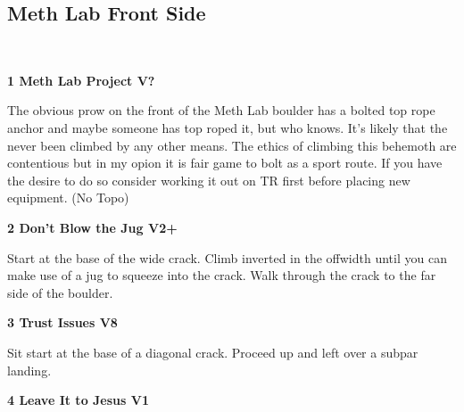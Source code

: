 \begin{multicols}{2}
\begin{minipage}{\columnwidth}
			\subsection*{Meth Lab Front Side}\label{bf:Meth Lab Front Side}
			\
			
			\end{minipage}
			
					\begin{minipage}{\linewidth}	
					\label{rt:Meth Lab Project}
\colorbox{black!20}{
\parbox{0.95\textwidth}{
\textbf{
1 Meth Lab Project V?  \warn \warn \warn 
}
}
}

					\begin{adjustwidth}{0.5cm}{}				
					The obvious prow on the front of the Meth Lab boulder has a bolted top rope anchor and maybe someone has top roped it, but who knows. It's likely that the never been climbed by any other means. The ethics of climbing this behemoth are contentious but in my opion it is fair game to bolt as a sport route. If you have the desire to do so consider working it out on TR first before placing new equipment.
						\newline (No Topo) 
					\end{adjustwidth}
					\end{minipage}
					\begin{minipage}{\linewidth}	
					\label{rt:Don't Blow the Jug}
\colorbox{green!20}{
\parbox{0.95\textwidth}{
\textbf{
2 Don't Blow the Jug V2+    \warn 
}
}
}

					\begin{adjustwidth}{0.5cm}{}				
					Start at the base of the wide crack. Climb inverted in the offwidth until you can make use of a jug to squeeze into the crack. Walk through the crack to the far side of the boulder.
					\end{adjustwidth}
					\end{minipage}
					\begin{minipage}{\linewidth}	
					\label{rt:Trust Issues}
\colorbox{Goldenrod!50}{
\parbox{0.95\textwidth}{
\textbf{
3 Trust Issues V8  \warn \warn 
}
}
}

					\begin{adjustwidth}{0.5cm}{}				
					Sit start at the base of a diagonal crack. Proceed up and left over a subpar landing.
					\end{adjustwidth}
					\end{minipage}
					\begin{minipage}{\linewidth}	
					\label{rt:Leave It to Jesus}
\colorbox{green!20}{
\parbox{0.95\textwidth}{
\textbf{
4 Leave It to Jesus V1     
}
}
}


\end{minipage}
\end{multicols}
